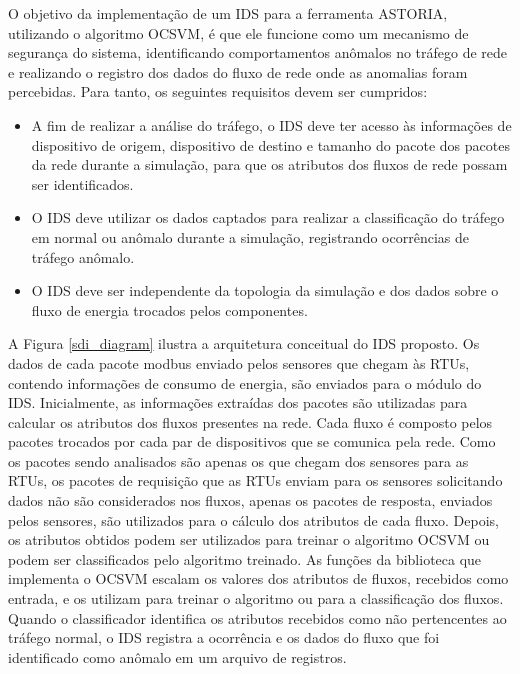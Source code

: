 \documentclass[cic,tc]{iiufrgs}
\begin{document}
O objetivo da implementação de um IDS para a ferramenta ASTORIA, utilizando o algoritmo OCSVM, é que ele funcione como um mecanismo de segurança do sistema, identificando comportamentos anômalos no tráfego de rede e realizando o registro dos dados do fluxo de rede onde as anomalias foram percebidas. Para tanto, os seguintes requisitos devem ser cumpridos:
\begin{itemize}
\item{} A fim de realizar a análise do tráfego, o IDS deve ter acesso às informações de dispositivo de origem, dispositivo de destino e tamanho do pacote dos pacotes da rede durante a simulação, para que os atributos dos fluxos de rede possam ser identificados.
\item{} O IDS deve utilizar os dados captados para realizar a classificação do tráfego em normal ou anômalo durante a simulação, registrando ocorrências de tráfego anômalo.
\item{} O IDS deve ser independente da topologia da simulação e dos dados sobre o fluxo de energia trocados pelos componentes.
\end{itemize}

A Figura \ref{sdi_diagram} ilustra a arquitetura conceitual do IDS proposto. Os dados de cada pacote modbus enviado pelos sensores que chegam às RTUs, contendo informações de consumo de energia, são enviados para o módulo do IDS. Inicialmente, as informações extraídas dos pacotes são utilizadas para calcular os atributos dos fluxos presentes na rede. Cada fluxo é composto pelos pacotes trocados por cada par de dispositivos que se comunica pela rede. Como os pacotes sendo analisados são apenas os que chegam dos sensores para as RTUs, os pacotes de requisição que as RTUs enviam para os sensores solicitando dados não são considerados nos fluxos, apenas os pacotes de resposta, enviados pelos sensores, são utilizados para o cálculo dos atributos de cada fluxo. Depois, os atributos obtidos podem ser utilizados para treinar o algoritmo OCSVM ou podem ser classificados pelo algoritmo treinado. As funções da biblioteca que implementa o OCSVM escalam os valores dos atributos de fluxos, recebidos como entrada, e os utilizam para treinar o algoritmo ou para a classificação dos fluxos. Quando o classificador identifica os atributos recebidos como não pertencentes ao tráfego normal, o IDS registra a ocorrência e os dados do fluxo que foi identificado como anômalo em um arquivo de registros.
\end{document}
